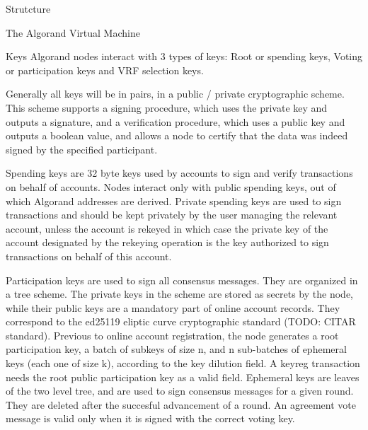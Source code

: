 \documentclass[10pt,a4paper]{article}
\begin{document}
\begin{section}{Strutcture}
\begin{subsection}{The Algorand Virtual Machine}
\end{subsection}
\begin{subsection}{Keys}
    Algorand nodes interact with 3 types of keys:
    Root or spending keys,
    Voting or participation keys and
    VRF selection keys.

    Generally all keys will be in pairs, in a public / private cryptographic scheme.
    This scheme supports a signing procedure, which uses the private key and outputs a signature, 
    and a verification procedure, which uses a public key and outputs a boolean value, and allows
    a node to certify that the data was indeed signed by the specified participant.

    Spending keys are 32 byte keys used by accounts to sign and verify transactions
    on behalf of accounts. Nodes interact only with public spending keys, out of which
    Algorand addresses are derived. Private spending keys are used to sign transactions
    and should be kept privately by the user managing the relevant account, unless the account
    is rekeyed in which case the private key of the account designated by the rekeying operation
    is the key authorized to sign transactions on behalf of this account.

    Participation keys are used to sign all consensus messages. They are organized in a tree scheme.
    The private keys in the scheme are stored as secrets by the node,
    while their public keys are a mandatory part of online account records.
    They correspond to the ed25119 eliptic curve cryptographic standard (TODO: CITAR standard).
    Previous to online account registration, the node generates a root participation key, a batch of subkeys
    of size n, and n sub-batches of ephemeral keys (each one of size k), according to the key dilution field.
    A keyreg transaction needs the root public participation key as a valid field.
    Ephemeral keys are leaves of the two level tree, and are used to sign consensus messages for a given round.
    They are deleted after the succesful advancement of a round.
    An agreement vote message is valid only when it is signed with the correct voting key.



\end{subsection}
\end{section}
\end{document}
